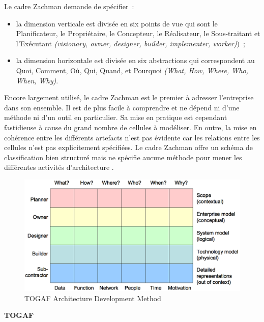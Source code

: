 Le cadre Zachman demande de spécifier~:

	\begin{itemize}

\item la dimension verticale est divisée en six points de vue qui sont le Planificateur, le Propriétaire, le Concepteur, le Réalisateur, le Sous-traitant et l'Exécutant \textit{(visionary, owner, designer, builder, implementer, worker)})~;

\item la dimension horizontale est divisée en six abstractions qui correspondent au Quoi, Comment, Où, Qui, Quand, et Pourquoi \textit{(What, How, Where, Who, When, Why)}.
	\end{itemize}	

Encore largement utilisé, le cadre Zachman est le premier à adresser l'entreprise dans son ensemble. Il est de plus facile à comprendre et ne dépend ni d'une méthode ni d'un outil en particulier. Sa mise en pratique est cependant fastidieuse à cause du grand nombre de cellules à modéliser. En outre, la mise en cohérence entre les différents artefacts n'est pas évidente car les relations entre les cellules n'est pas explicitement spécifiées. Le cadre Zachman offre un schéma de classification bien structuré mais ne spécifie aucune méthode pour mener les différentes activités d'architecture \cite{lankhorst2013enterprise}.


\begin{figure}[!htbp]
 \begin{center}
  \includegraphics[width=1\textwidth]{images/Chapitre1/zachman.png}
 \end{center}
 \caption{TOGAF Architecture Development Method  \protect\cite{zachman1987framework}}
 \label{fig:Zachman}
\end{figure}

\textbf{TOGAF} 

